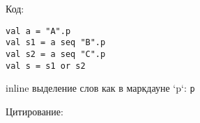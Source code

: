 Код:
\begin{lstlisting}
val a = "A".p
val s1 = a seq "B".p
val s2 = a seq "C".p
val s = s1 or s2
\end{lstlisting}

inline выделение слов как в маркдауне `p`: \verb|p|

Цитирование: \cite{Trails}

